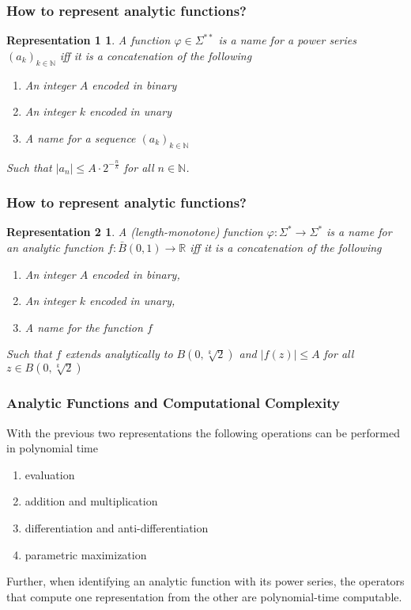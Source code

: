 \documentclass[xcolor=pdftex,dvipsnames,table]{beamer}
\newcommand{\N}{\ensuremath{\mathbb{N}}}
\newcommand{\R}{\ensuremath{\mathbb{R}}}
\newcommand{\sigmas}{\ensuremath{\Sigma^{**}}}
\newcommand{\abs}[1]{\left|#1\right|}
\newtheorem{representation1}{Representation 1}
\newtheorem{representation2}{Representation 2}
\begin{document}
\begin{frame}
\frametitle{How to represent analytic functions?}
\begin{representation1}
  A function $\varphi \in \sigmas$ is a name for a power series $(a_k)_{k \in \N}$ iff it is a concatenation of the following
  \begin{enumerate}
  \item An integer $A$ encoded in binary
  \item An integer $k$ encoded in unary
  \item A name for a sequence $(a_k)_{k \in \N}$
  \end{enumerate}
  Such that $\abs{a_n} \leq A \cdot 2^{-\frac{n}{k}}$ for all $n \in \N$.
\end{representation1}
\end{frame}
\begin{frame}
\frametitle{How to represent analytic functions?}
\begin{representation2}
  A (length-monotone) function $\varphi: \Sigma^* \to \Sigma^*$ is a name for an analytic function $f:\bar B(0,1) \to \R$ iff it is a concatenation of the following  
  \begin{enumerate}
  \item An integer $A$ encoded in binary,
  \item An integer $k$ encoded in unary,
  \item A name for the function $f$
  \end{enumerate}
  Such that $f$ extends analytically to $B(0, \sqrt[k]{2})$ and $\abs{f(z)} \leq A$ for all $z \in B(0, \sqrt[k]{2})$
\end{representation2}
\end{frame}
\begin{frame}
\frametitle{Analytic Functions and Computational Complexity}
\begin{theorem}
  With the previous two representations the following operations can be performed in polynomial time
\begin{enumerate}
\item evaluation
\item addition and multiplication
\item differentiation and anti-differentiation
\item parametric maximization
\end{enumerate}
\pause
Further, when identifying an analytic function with its power series, the operators that compute one representation from the other are polynomial-time computable.
\end{theorem}
\end{frame}
\end{document}
